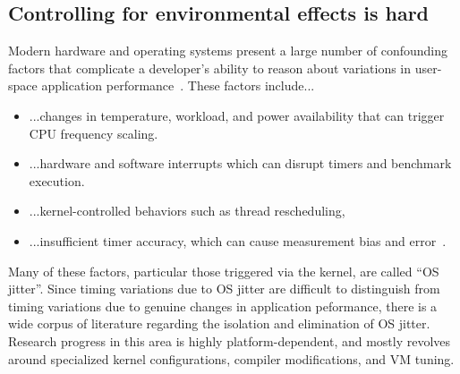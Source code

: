 \documentclass[conference]{IEEEtran}
\begin{document}
\subsection{Controlling for environmental effects is hard}

Modern hardware and operating systems present a large number of confounding factors that
complicate a developer's ability to reason about variations in user-space application
performance~\cite{HP5e}. These factors include...

\begin{itemize}
    \item ...changes in temperature, workload, and power availability that can trigger
    CPU frequency scaling.
    \item ...hardware and software interrupts which can disrupt timers and benchmark
    execution.
    \item ...kernel-controlled behaviors such as thread rescheduling, 
    \item ...insufficient timer accuracy, which can cause measurement bias and
    error~\cite{Mytkowicz2009}.
\end{itemize}

Many of these factors, particular those triggered via the kernel, are called ``OS jitter''.
Since timing variations due to OS jitter are difficult to distinguish from timing variations
due to genuine changes in application peformance, there is a wide corpus of literature
regarding the isolation and elimination of OS jitter. Research progress in this area is
highly platform-dependent, and mostly revolves around specialized kernel configurations,
compiler modifications, and VM tuning.

\end{document}
